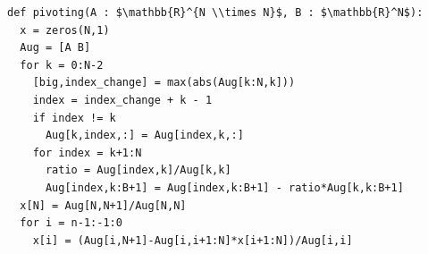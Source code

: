\documentclass[border=10pt]{standalone}
\begin{document}
\begin{lstlisting}
def pivoting(A : $\mathbb{R}^{N \\times N}$, B : $\mathbb{R}^N$):
  x = zeros(N,1)
  Aug = [A B]
  for k = 0:N-2
    [big,index_change] = max(abs(Aug[k:N,k]))
    index = index_change + k - 1
    if index != k
      Aug[k,index,:] = Aug[index,k,:]
    for index = k+1:N
      ratio = Aug[index,k]/Aug[k,k]
      Aug[index,k:B+1] = Aug[index,k:B+1] - ratio*Aug[k,k:B+1]
  x[N] = Aug[N,N+1]/Aug[N,N]
  for i = n-1:-1:0
    x[i] = (Aug[i,N+1]-Aug[i,i+1:N]*x[i+1:N])/Aug[i,i]
\end{lstlisting}
\end{document}

